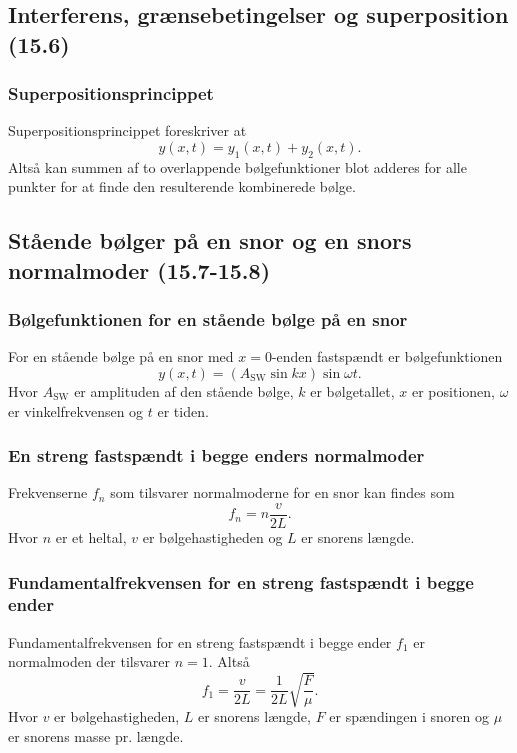\subsection{Interferens, grænsebetingelser og superposition (15.6)}

\subsubsection{Superpositionsprincippet}
Superpositionsprincippet foreskriver at
\[ 
y(x,t) = y_1(x,t) + y_2(x,t)
.\]
Altså kan summen af to overlappende bølgefunktioner blot adderes for alle punkter for at finde den resulterende kombinerede bølge. 


\subsection{Stående bølger på en snor og en snors normalmoder (15.7-15.8)}

\subsubsection{Bølgefunktionen for en stående bølge på en snor} \label{afs:bølfunstå}
For en stående bølge på en snor med $x=0$-enden fastspændt er bølgefunktionen
\[ 
y(x,t) = (A_{\text{SW}} \sin kx) \sin \omega t
.\]
Hvor $A_{\text{SW}}$ er amplituden af den stående bølge, $k$ er bølgetallet, $x$ er positionen, $\omega$ er vinkelfrekvensen og $t$ er tiden.



\subsubsection{En streng fastspændt i begge enders normalmoder} \label{afs:normod}
Frekvenserne $f_n$ som tilsvarer normalmoderne for en snor kan findes som
\[ 
f_n = n \frac{v}{2L}
.\]
Hvor $n$ er et heltal, $v$ er bølgehastigheden og $L$ er snorens længde.


\subsubsection{Fundamentalfrekvensen for en streng fastspændt i begge ender} \label{afs:funfrek}
Fundamentalfrekvensen for en streng fastspændt i begge ender $f_1$ er normalmoden der tilsvarer $n=1$. Altså
\[ 
f_1 = \frac{v}{2L} = \frac{1}{2L} \sqrt{\frac{F}{\mu}}
.\]
Hvor $v$ er bølgehastigheden, $L$ er snorens længde, $F$ er spændingen i snoren og $\mu$ er snorens masse pr. længde.
